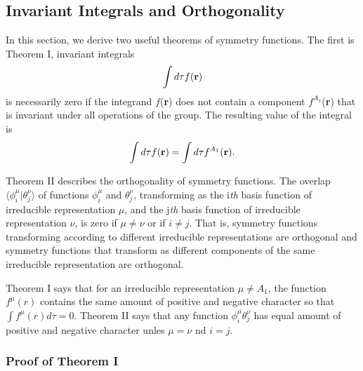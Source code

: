 \subsection{Invariant Integrals and Orthogonality}

In this section, we derive two useful theorems of symmetry 
functions.  The first is Theorem I, invariant integrals
\begin{equation}
\int d \tau f ( {\bf r} )
\label{chap16-eqno61}
\end{equation}
is necessarily zero if the integrand $f$({\bf r}) does not contain a 
component $f^{A_1}$({\bf r}) that is invariant under all operations 
of the group.  The resulting value of the integral is
\begin{equation}
\int d \tau f ( {\bf r} ) = \int d \tau f^{A_1}({\bf r}).
\end{equation}

Theorem II describes the orthogonality of symmetry functions.  The 
overlap $\langle \phi^{\mu}_i | \theta^{\nu}_j \rangle$ of functions
$\phi^{\mu}_i$ and $\theta^{\nu}_j$, transforming as the i{\it th} 
basis function of irreducible representation $\mu$, and the j{\it th} 
basis function of irreducible representation  $\nu$, is zero if $\mu 
\not= \nu$ or if $i \not= j$.  That is, symmetry functions 
transforming according to different irreducible representations are 
orthogonal and symmetry functions that transform as different 
components of the same irreducible representation  are orthogonal.

Theorem I says that for an irreducible representation $\mu \not= A_1$, 
the function $f^{\mu}(r)$ contains the same amount of positive and 
negative character so that $\int f^{\mu}(r)d \tau = 0$.  Theorem II 
says that any function $\phi^{\mu}_i \theta^{\nu}_j$ has equal amount 
of positive and negative character unles $\mu = \nu$ nd $i = j$.

\subsubsection{Proof of Theorem I}

